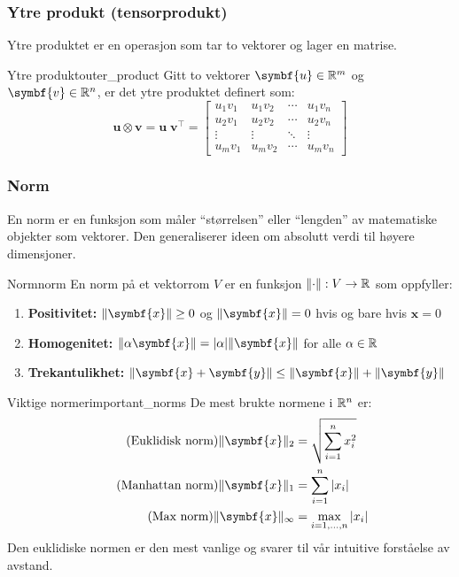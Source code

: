 \subsubsection{Ytre produkt (tensorprodukt)}
Ytre produktet er en operasjon som tar to vektorer og lager en matrise.
\begin{definition}{Ytre produkt}{outer_product}
	Gitt to vektorer \( \symbf{u} \in \R^m \) og \( \symbf{v} \in \R^n \), er det ytre produktet definert som:
	\[
		\symbf{u} \otimes \symbf{v} = \symbf{u} \; \symbf{v}^\top =
		\begin{bmatrix}
			u_1v_1 & u_1v_2 & \cdots & u_1v_n \\
			u_2v_1 & u_2v_2 & \cdots & u_2v_n \\
			\vdots & \vdots & \ddots & \vdots \\
			u_mv_1 & u_mv_2 & \cdots & u_mv_n
		\end{bmatrix}
	\]
\end{definition}

\subsubsection{Norm}
En norm er en funksjon som måler \enquote{størrelsen} eller \enquote{lengden} av matematiske objekter som vektorer.
Den generaliserer ideen om absolutt verdi til høyere dimensjoner.

\begin{definition}{Norm}{norm}
	En norm på et vektorrom \(V\) er en funksjon \(\lVert\cdot\rVert: V \to \mathbb{R}\) som oppfyller:
	\begin{enumerate}
		\item \textbf{Positivitet:} \(\norm{\symbf{x}} \geq 0\) og \(\norm{\symbf{x}} = 0\) hvis og bare hvis \(\symbf{x} = 0\)
		\item \textbf{Homogenitet:} \(\norm{\alpha \symbf{x}} = |\alpha| \norm{\symbf{x}}\) for alle \(\alpha \in \mathbb{R}\)
		\item \textbf{Trekantulikhet:} \(\norm{\symbf{x} + \symbf{y}} \leq \norm{\symbf{x}} + \norm{\symbf{y}}\)
	\end{enumerate}
\end{definition}

\begin{remark}{Viktige normer}{important_norms}
	De mest brukte normene i \(\mathbb{R}^n\) er:
	\begin{align*}
		\tag{Euklidisk norm} \norm{\symbf{x}}_2 & = \sqrt{\sum_{i=1}^{n} x_i^2} \\
		\tag{Manhattan norm} \norm{\symbf{x}}_1 & = \sum_{i=1}^{n} |x_i|        \\
		\tag{Max norm} \norm{\symbf{x}}_\infty  & = \max_{i=1,\ldots,n} |x_i|
	\end{align*}
	Den euklidiske normen er den mest vanlige og svarer til vår intuitive forståelse av avstand.
\end{remark}

